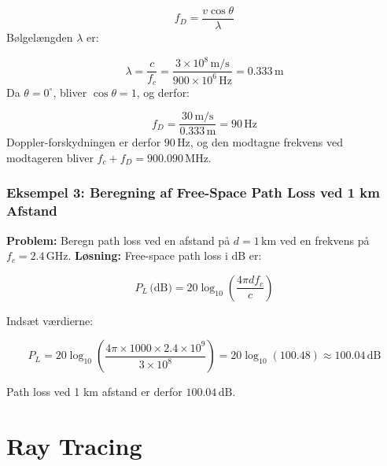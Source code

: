 \documentclass[a4paper,12pt]{book}
\begin{document}
	\[
	f_D = \frac{v \cos \theta}{\lambda}
	\]
	\noindent
	Bølgelængden \( \lambda \) er:
	
	\[
	\lambda = \frac{c}{f_c} = \frac{3 \times 10^8 \, \text{m/s}}{900 \times 10^6 \, \text{Hz}} = 0.333 \, \text{m}
	\]
	\noindent
	Da \( \theta = 0^\circ \), bliver \( \cos \theta = 1 \), og derfor:
	
	\[
	f_D = \frac{30 \, \text{m/s}}{0.333 \, \text{m}} = 90 \, \text{Hz}
	\]
	\noindent
	Doppler-forskydningen er derfor \( 90 \, \text{Hz} \), og den modtagne frekvens ved modtageren bliver \( f_c + f_D = 900.090 \, \text{MHz} \).
	
	\subsubsection{Eksempel 3: Beregning af Free-Space Path Loss ved 1 km Afstand}
	\textbf{Problem:} Beregn path loss ved en afstand på \( d = 1 \, \text{km} \) ved en frekvens på \( f_c = 2.4 \, \text{GHz} \).
	\newline\newline\noindent
	\textbf{Løsning:}
	Free-space path loss i dB er:
	
	\[
	P_L \, \text{(dB)} = 20 \log_{10} \left( \frac{4\pi d f_c}{c} \right)
	\]
	
	Indsæt værdierne:
	
	\[
	P_L = 20 \log_{10} \left( \frac{4\pi \times 1000 \times 2.4 \times 10^9}{3 \times 10^8} \right) = 20 \log_{10} (100.48) \approx 100.04 \, \text{dB}
	\]
	
	Path loss ved 1 km afstand er derfor \( 100.04 \, \text{dB} \).
	
	
	\section{Ray Tracing}
	
\end{document}
